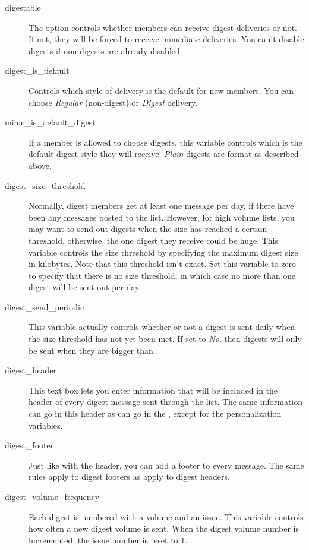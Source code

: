 \documentclass{howto}
\begin{document}
\begin{description}
\item[digestable]
    The option controls whether members can receive digest deliveries
    or not.  If not, they will be forced to receive immediate
    deliveries.  You can't disable digests if non-digests are already
    disabled.

\item[digest_is_default]
    Controls which style of delivery is the default for new members.
    You can choose \emph{Regular} (non-digest) or \emph{Digest}
    delivery.

\item[mime_is_default_digest]
    If a member is allowed to choose digests, this variable controls
    which is the default digest style they will receive.  \emph{Plain}
    digests are  format as described above.

\item[digest_size_threshold]
    Normally, digest members get at least one message per day, if
    there have been any messages posted to the list.  However, for
    high volume lists, you may want to send out digests when the size
    has reached a certain threshold, otherwise, the one digest they
    receive could be huge.  This variable controls the size threshold
    by specifying the maximum digest size in kilobytes.  Note that
    this threshold isn't exact.  Set this variable to zero to specify
    that there is no size threshold, in which case no more than one
    digest will be sent out per day.

\item[digest_send_periodic]
    This variable actually controls whether or not a digest is sent
    daily when the size threshold has not yet been met.  If set to
    \emph{No}, then digests will only be sent when they are bigger
    than .

\item[digest_header]
    This text box lets you enter information that will be included in
    the header of every digest message sent through the list.  The
    same information can go in this header as can go in the
    , except for the personalization variables.

\item[digest_footer]
    Just like with the header, you can add a footer to every message.
    The same rules apply to digest footers as apply to digest headers.
    
\item[digest_volume_frequency]
    Each digest is numbered with a volume and an issue.  This variable
    controls how often a new digest volume is sent.  When the digest
    volume number is incremented, the issue number is reset to 1.


\end{description}
\end{document}
